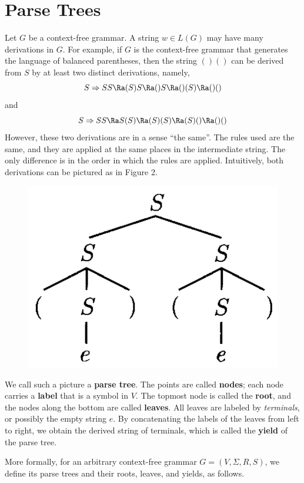 \section{Parse Trees}

\begin{multicols}{2}
\setlength{\columnsep}{1.5cm}
\setlength{\columnseprule}{0.2pt}

Let $G$ be a context-free grammar. A string $w \in L(G)$ may have many derivations in $G$. For example, if $G$ is the context-free grammar that generates the language of balanced parentheses, then the string $()()$ can
be derived from $S$ by at least two distinct derivations, namely,
\begin{equation*}
    S \Rightarrow SS \Ra (S)S \Ra ()S \Ra ()(S) \Ra ()()
\end{equation*}
and
\begin{equation*}
    S \Rightarrow SS \Ra S(S) \Ra (S)(S) \Ra (S)() \Ra ()()
\end{equation*}
However, these two derivations are in a sense ``the same''. The rules used are the same, and they are applied at the same places in the intermediate string. The only difference is in the order in which the rules are applied. Intuitively, both derivations can be pictured as in Figure 2.
\begin{figure}[H]
    \centering
    \includegraphics[width=.2\textwidth]{img/fig3-2.png}
    \caption{}
\end{figure}

We call such a picture a \textbf{parse tree}. The points are called \textbf{nodes}; each node carries a \textbf{label} that is a symbol in $V$. The topmost node is called the \textbf{root}, and the nodes along the bottom are called \textbf{leaves}. All leaves are labeled by \textit{terminals}, or possibly the empty string $e$. By concatenating the labels of the leaves from left to right, we obtain the derived string of terminals, which is
called the \textbf{yield} of the parse tree.


More formally, for an arbitrary context-free grammar $G = (V, \Sigma, R, S)$, we define its parse trees and their roots, leaves, and yields, as follows.


\end{multicols}
